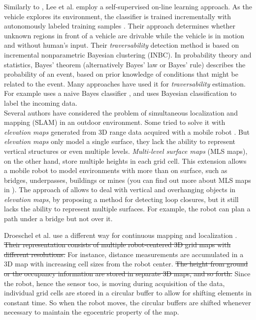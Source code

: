 \documentclass[12pt,a4paper]{report}
\newcommand{\term}{\textit}
\newcommand{\acronym}{\MakeUppercase}
\begin{document}
	Similarly to \cite{Kim}, Lee et al. employ a self-supervised on-line learning 
	approach. As the vehicle explores its environment, the classifier is trained 
	incrementally with autonomously labeled training samples \cite{Lee}. Their 
	approach determines whether unknown regions in front of a vehicle are drivable 
	while the vehicle is in motion and without human’s input. Their 
	\term{traversability} detection method is based on incremental nonparametric 
	Bayesian clustering (\acronym{inbc}). In probability theory and statistics, 
	Bayes' theorem (alternatively Bayes' law or Bayes' rule) describes the 
	probability of an event, based on prior knowledge of conditions that might be 
	related to the event. Many approaches have used it for \term{traversability} 
	estimation. For example \cite{Suger} uses a naive Bayes classifier \cite{Denis}, 
	and \cite{Lalonde} uses Bayesian classification to label the incoming data.
	\\
	
	Several authors have considered the problem of simultaneous localization and 
	mapping (\acronym{slam}) in an outdoor environment. Some tried to solve it with 
	\term{elevation maps} generated from \acronym{3d} range data acquired with a 
	mobile robot \cite{Pfaff}. But \term{elevation maps} only model a single surface, 
	they lack the ability to represent vertical structures or even multiple levels.
	\term{Multi-level surface maps} (\acronym{mls} maps), on the other hand, store 
	multiple heights in each grid cell. This extension allows a mobile robot to model 
	environments with more than on surface, such as bridges, underpasses, buildings 
	or mines (you can find out more about \acronym{mls} maps in \cite{Triebel}). The 
	approach of \cite{Pfaff} allows to deal with vertical and overhanging objects in 
	\term{elevation maps}, by proposing a method for detecting loop closures, but it 
	still lacks the ability to represent multiple surfaces. For example, the robot 
	can plan a path under a bridge but not over it.
	\par
	Droeschel et al. use a different way for continuous mapping and localization 
	\cite{Droeschel}. \sout{Their representation consists of multiple robot-centered 
	\acronym{3d} grid maps with different resolutions.} For instance, distance 
	measurements are accumulated in a \acronym{3d} map with increasing cell sizes 
	from the robot center. \sout{The height from ground or the occupancy information are 
	stored in separate \acronym{3d} maps, and so forth.} Since the robot, hence the 
	sensor too, is moving during acquisition of the data, individual grid cells are 
	stored in a circular buffer to allow for shifting elements in constant time. So 
	when the robot moves, the circular buffers are shifted whenever necessary to 
	maintain the egocentric property of the map.
	
\end{document}
